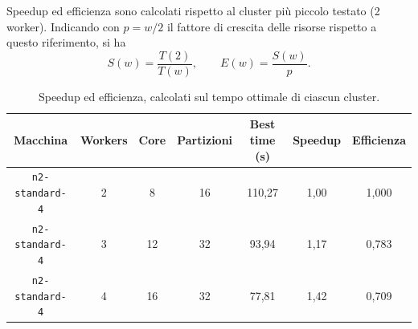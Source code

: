 \documentclass[11pt,a4paper]{article}
\begin{document}
Speedup ed efficienza sono calcolati rispetto al cluster più piccolo testato (2 worker). 
Indicando con $p = w/2$ il fattore di crescita delle risorse rispetto a questo riferimento, si ha
\[
S(w) = \frac{T(2)}{T(w)}, \qquad
E(w) = \frac{S(w)}{p}.
\]


\begin{table}[h]
\centering
\small
\caption{Speedup ed efficienza, calcolati sul tempo ottimale di ciascun cluster.}
\begin{tabular}{ccccccc}
\toprule
\textbf{Macchina} & \textbf{Workers} & \textbf{Core} & \textbf{Partizioni} & \textbf{Best time (s)} & \textbf{Speedup} & \textbf{Efficienza} \\
\midrule
\texttt{n2-standard-4} & 2 & 8  & 16 & 110,27 & 1,00 & 1,000 \\
\texttt{n2-standard-4} & 3 & 12 & 32 & 93,94  & 1,17 & 0,783 \\
\texttt{n2-standard-4} & 4 & 16 & 32 & 77,81  & 1,42 & 0,709 \\
\bottomrule
\end{tabular}
\end{table}
\end{document}
